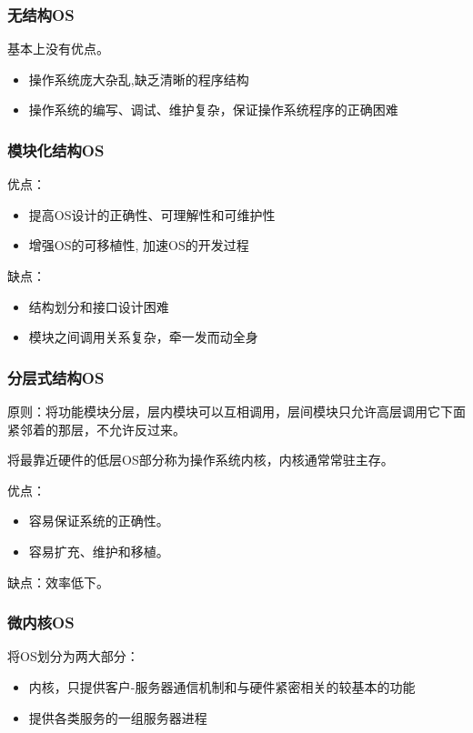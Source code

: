 \documentclass[12pt, a4paper, oneside]{ctexart}
\begin{document}
\subsubsection{无结构OS}

基本上没有优点。
\begin{itemize}
    \item 操作系统庞大杂乱,缺乏清晰的程序结构
    \item 操作系统的编写、调试、维护复杂，保证操作系统程序的正确困难
\end{itemize}

\subsubsection{模块化结构OS}

优点：
\begin{itemize}
    \item 提高OS设计的正确性、可理解性和可维护性
    \item 增强OS的可移植性, 加速OS的开发过程
\end{itemize}

缺点：
\begin{itemize}
    \item 结构划分和接口设计困难
    \item 模块之间调用关系复杂，牵一发而动全身
\end{itemize}

\subsubsection{分层式结构OS}

原则：将功能模块分层，层内模块可以互相调用，层间模块只允许高层调用它下面紧邻着的那层，不允许反过来。

将最靠近硬件的低层OS部分称为操作系统内核，内核通常常驻主存。

优点：
\begin{itemize}
    \item 容易保证系统的正确性。
    \item 容易扩充、维护和移植。
\end{itemize}

缺点：效率低下。

\subsubsection{微内核OS}

将OS划分为两大部分：
\begin{itemize}
    \item 内核，只提供客户-服务器通信机制和与硬件紧密相关的较基本的功能
    \item 提供各类服务的一组服务器进程
\end{itemize}
\end{document}
